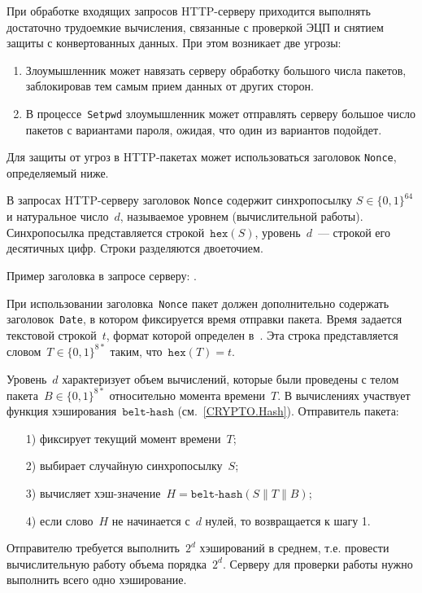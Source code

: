 При обработке входящих запросов HTTP-серверу приходится выполнять 
достаточно трудоемкие вычисления, связанные с проверкой ЭЦП и снятием 
защиты с конвертованных данных.
%
При этом возникает две угрозы:
\begin{enumerate}
\item
Злоумышленник может навязать серверу обработку большого числа пакетов, 
заблокировав тем самым прием данных от других сторон. 
\item
В процессе~\texttt{Setpwd} злоумышленник может отправлять серверу большое 
число пакетов с вариантами пароля, ожидая, что один из вариантов подойдет. 
\end{enumerate}

Для защиты от угроз в HTTP-пакетах может использоваться заголовок 
\texttt{Nonce}, определяемый ниже. 

В запросах HTTP-серверу заголовок \texttt{Nonce} содержит синхропосылку 
$S\in\{0,1\}^{64}$ и натуральное число~$d$, называемое уровнем 
(вычислительной работы).
%
Синхропосылка представляется строкой~$\texttt{hex}(S)$, уровень~$d$~--- 
строкой его десятичных цифр. Строки разделяются двоеточием.

Пример заголовка в запросе серверу: .

При использовании заголовка~\texttt{Nonce} пакет должен дополнительно
содержать заголовок~\texttt{Date}, в котором фиксируется время отправки 
пакета. Время задается текстовой строкой~$t$, формат которой определен 
в~\cite{HTTP}. Эта строка представляется словом~$T\in\{0,1\}^{8*}$ таким, 
что~$\texttt{hex}(T)=t$.

Уровень~$d$ характеризует объем вычислений, которые были проведены
с телом пакета~$B\in\{0,1\}^{8*}$ относительно момента времени~$T$.
%
В вычислениях участвует функция хэширования~$\texttt{belt-hash}$
(см.~\ref{CRYPTO.Hash}). Отправитель пакета:
\begin{enumerate}
\item[1)]
фиксирует текущий момент времени~$T$;
\item[2)]
выбирает случайную синхропосылку~$S$;
\item[3)]
вычисляет хэш-значение~$H=\texttt{belt-hash}(S\parallel T\parallel B)$;
\item[4)]
если слово~$H$ не начинается с~$d$ нулей, то возвращается к шагу 1.
\end{enumerate}

Отправителю требуется выполнить~$2^d$ хэширований в среднем, т.е. провести 
вычислительную работу объема порядка~$2^d$. Серверу для проверки работы 
нужно выполнить всего одно хэширование.

